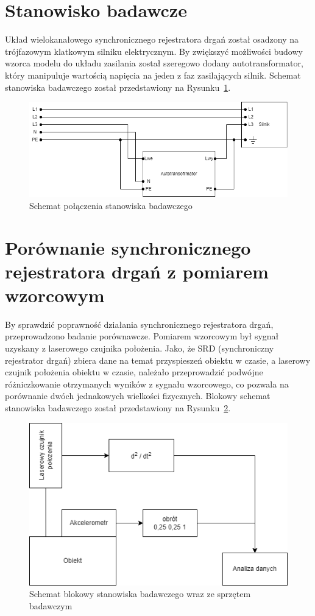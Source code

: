 \documentclass[a4paper, 12pt]{mwart}
\title{}
\author{}
\date{}
\begin{document}
\maketitle

\section{Stanowisko badawcze}
Układ wielokanałowego synchronicznego rejestratora drgań został osadzony na trójfazowym klatkowym silniku elektrycznym. By zwiększyć możliwości budowy wzorca modelu do układu zasilania został szeregowo dodany autotransformator, który manipuluje wartością napięcia na jeden z faz zasilających silnik. Schemat stanowiska badawczego został przedstawiony na Rysunku~\ref{fig:circut}.

\begin{figure}[th]
	\centering
	\includegraphics[width=0.9\linewidth]{assets/circut}
	\caption{Schemat połączenia stanowiska badawczego}
	\label{fig:circut}
\end{figure}

\section{Porównanie synchronicznego rejestratora drgań z pomiarem wzorcowym}
By sprawdzić poprawność działania synchronicznego rejestratora drgań, przeprowadzono badanie porównawcze. Pomiarem wzorcowym był sygnał uzyskany z laserowego czujnika położenia. Jako, że SRD (synchroniczny rejestrator drgań) zbiera dane na temat przyspieszeń obiektu w czasie, a laserowy czujnik położenia obiektu w czasie, należało przeprowadzić podwójne różniczkowanie otrzymanych wyników z sygnału wzorcowego, co pozwala na porównanie dwóch jednakowych wielkości fizycznych. 
Blokowy schemat stanowiska badawczego został przedstawiony na Rysunku~\ref{fig:wibro1}. 
\begin{figure}[H]
	\centering
	\includegraphics[width=0.8\linewidth]{assets/wibro1.drawio}
	\caption{Schemat blokowy stanowiska badawczego wraz ze sprzętem badawczym}
	\label{fig:wibro1}
\end{figure}
\end{document}
